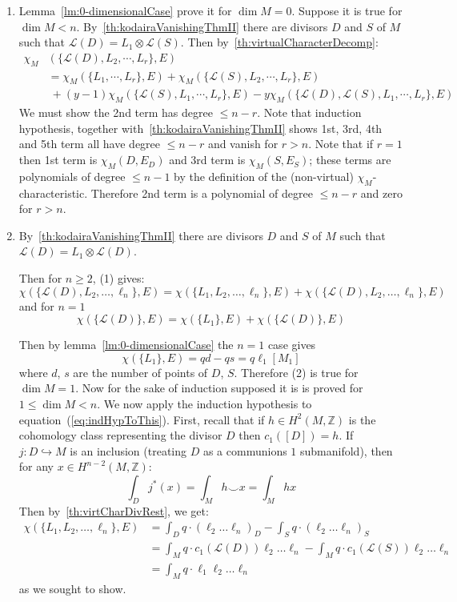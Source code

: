 \documentclass{book}
\newenvironment{Proof}[1][]
  {\begin{ProofTcb}[#1]}
  {\end{ProofTcb}}
\newcommand{\Z}{{\mathbb{Z}}}
\newcommand{\CL}{{\mathcal{L}}}
\begin{document}
\begin{Proof}
\begin{enumerate}
  \item[1/2. ] Lemma~\cref{lm:0-dimensionalCase} prove it for $\dim M=0$. Suppose it is true for $\dim M<n$.
    By~\cref{th:kodairaVanishingThmII} there are divisors $D$ and $S$ of $M$ such that
    $\CL(D)=L_1\otimes\CL(S)$. Then by~\cref{th:virtualCharacterDecomp}:
    \begin{align*}
      \chi_M&(\{ \CL(D),L_2,\cdots,L_r \},E)\\
    &= \chi_M(\{ L_1,\cdots,L_r \},E) + \chi_M(\{ \CL(S),L_2,\cdots,L_r \},E) \\
                          &\ + (y-1)\chi_M(\{\CL(S),L_1,\cdots,L_r\},E)
                          - y\chi_M(\{\CL(D),\CL(S),L_1,\cdots,L_r\},E)
  \end{align*}
We must show the 2nd term has degree $\leq n-r$. Note that
induction hypothesis, together with~\cref{th:kodairaVanishingThmII} shows 1st, 3rd, 4th and 5th term all have
degree $\leq n-r$ and vanish for $r>n$. Note that if $r=1$ then 1st term is $\chi_M(D,E_D)$ and 3rd term is
$\chi_M(S,E_S)$; these terms are polynomials of degree $\leq n-1$ by the definition of the (non-virtual)
$\chi_M$-characteristic. Therefore 2nd term is a polynomial of degree $\leq n-r$ and zero for $r>n$.
\item[3. ] By~\cref{th:kodairaVanishingThmII} there are  divisors $D$ and $S$ of $M$
  such that $\CL(D)=L_1\otimes\CL(D)$.

Then for $n\ge 2$, (1) gives:
\[
    \chi(\{ \CL(D),L_2,\ldots,\ell_n \},E) = \chi(\{ L_1,L_2,\ldots,\ell_n \},E) + \chi(\{
    \CL(D),L_2,\ldots,\ell_n \},E)
\]
and for $n=1$
\begin{equation}\label{eq:indHypToThis}
    \chi(\{ \CL(D) \},E) = \chi(\{ L_1 \},E) + \chi(\{ \CL(D) \},E)
\end{equation}

Then by lemma~\cref{lm:0-dimensionalCase} the $n=1$ case gives
\[
    \chi(\{ L_1 \},E) = qd - qs = q\ell_1[M_1]
\]
where $d$, $s$ are the number of points of $D$, $S$. Therefore (2) is true for $\dim M=1$. Now for the sake of
induction supposed it is is proved for $1\leq\dim M<n$. We now apply the induction hypothesis to
equation~(\ref{eq:indHypToThis}). First, recall that if $h \in H^2(M, \Z)$ is the cohomology class
representing the divisor $D$ then $c_1([D]) = h$. If $j: D \hookrightarrow M$ is an inclusion (treating $D$ as
a communions $1$ submanifold), then for any $x \in H^{n-2}(M, \Z)$:
\[
  \int_D j^*(x) = \int_M h\smile x = \int_M hx
\]
Then by~\cref{th:virtCharDivRest}, we get:
\begin{align*}
    \chi(\{ L_1,L_2,\ldots,\ell_n \},E) &= \int_D q\cdot(\ell_2\ldots \ell_n)_D - \int_S q\cdot(\ell_2\ldots \ell_n)_S \\
    &= \int_M q\cdot c_1(\CL(D))\ell_2\ldots \ell_n - \int_Mq\cdot c_1(\CL(S))\ell_2\ldots \ell_n \\
    &= \int_M q\cdot \ell_1\ell_2\ldots \ell_n
\end{align*}
as we sought to show.
\end{enumerate}
\end{Proof}
\end{document}
